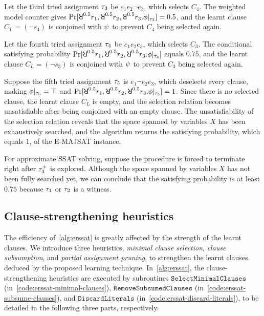 \begin{example}
    Let the third tried assignment $\tau_3$ be $e_1 e_2 \lnot e_3$,
    which selects $C_4$.
    The weighted model counter gives $\spb{\random{0.5} r_1,\random{0.5} r_2,\random{0.5} r_3.\pcf{\pf}{\as_3}}=0.5$,
    and the learnt clause $C_L=(\lnot s_4)$ is conjoined with $\psi$ to prevent $C_4$ being selected again.

    Let the fourth tried assignment $\tau_4$ be $e_1 e_2 e_3$,
    which selects $C_3$.
    The conditional satisfying probability $\spb{\random{0.5} r_1,\random{0.5} r_2,\random{0.5} r_3.\pcf{\pf}{\as_4}}$ equals $0.75$,
    and the learnt clause $C_L=(\lnot s_3)$ is conjoined with $\psi$ to prevent $C_3$ being selected again.

    Suppose the fifth tried assignment $\tau_5$ is $e_1 \lnot e_2 e_3$,
    which deselects every clause, making $\phi|_{\tau_5}=\top$ and
    $\spb{\random{0.5} r_1,\random{0.5} r_2,\random{0.5} r_3.\pcf{\pf}{\as_5}}=1$.
    Since there is no selected clause,
    the learnt clause $C_L$ is empty,
    and the selection relation becomes unsatisfiable after being conjoined with an empty clause.
    The unsatisfiability of the selection relation reveals that the space spanned by variables $X$ has been exhaustively searched,
    and the algorithm returns the satisfying probability, which equals $1$, of the E-MAJSAT instance.

    For approximate SSAT solving, suppose the procedure is forced to terminate right after $\tau_3^+$ is explored.
    Although the space spanned by variables $X$ has not been fully searched yet,
    we can conclude that the satisfying probability is at least $0.75$ because $\tau_1$ or $\tau_2$ is a witness.
\end{example}

\subsection{Clause-strengthening heuristics}
The efficiency of~\cref{alg:erssat} is greatly affected by the strength of the learnt clauses.
We introduce three heuristics,
\textit{minimal clause selection},
\textit{clause subsumption}, and
\textit{partial assignment pruning},
to strengthen the learnt clauses deduced by the proposed learning technique.
In~\cref{alg:erssat},
the clause-strengthening heuristics are executed by subroutines
$\texttt{SelectMinimalClauses}$ (in~\cref{code:erssat-minimal-clauses}),
$\texttt{RemoveSubsumedClauses}$ (in~\cref{code:erssat-subsume-clauses}), and
$\texttt{DiscardLiterals}$ (in~\cref{code:erssat-discard-literals}),
to be detailed in the following three parts, respectively.

